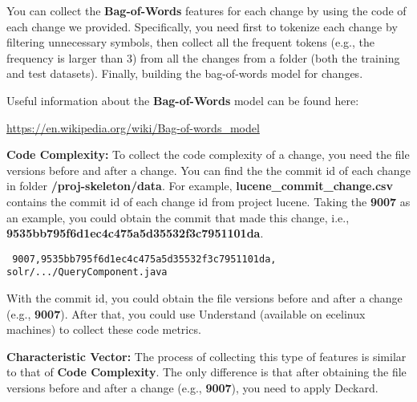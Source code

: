\documentclass[10pt]{article}
\begin{document}
You can collect the \textbf{Bag-of-Words} features for each change by using the code of each change we provided. 
Specifically, you need first to tokenize each change by filtering unnecessary symbols, 
then collect all the frequent tokens (e.g., the frequency is larger than 3) from all the changes from a folder 
(both the training and test datasets). 
Finally, building the bag-of-words model for changes. 

Useful information about the \textbf{Bag-of-Words} model can be found here:

\url{https://en.wikipedia.org/wiki/Bag-of-words_model}

\textbf{Code Complexity:}
To collect the code complexity of a change, you need the file versions before and after a change. 
You can find the the commit id of each change in folder \textbf{/proj-skeleton/data}. 
For example, \textbf{lucene\_commit\_change.csv} contains the commit id of each change id from project lucene.  
Taking the \textbf{9007} as an example, you could obtain the commit that made this change, 
i.e., \textbf{9535bb795f6d1ec4c475a5d35532f3c7951101da}.

\texttt{
9007,9535bb795f6d1ec4c475a5d35532f3c7951101da, solr/.../QueryComponent.java}

With the commit id, you could obtain the file versions before and after a change (e.g., \textbf{9007}). 
After that, you could use Understand (available on ecelinux machines) to collect these code metrics.

\textbf{Characteristic Vector:}
The process of collecting this type of features is similar to that of \textbf{Code Complexity}. 
The only difference is that after obtaining the file versions before and after a change (e.g., \textbf{9007}), 
you need to apply Deckard.
\end{document}
